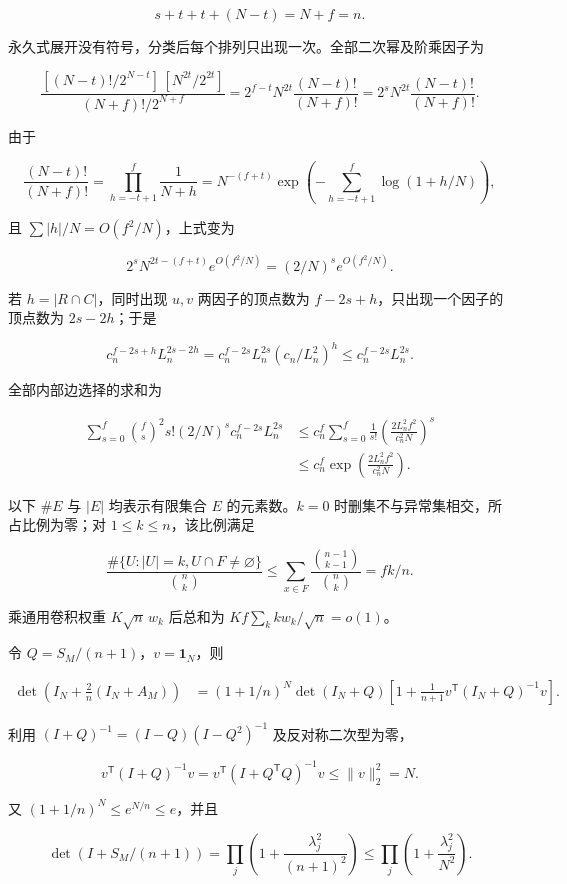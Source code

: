 \documentclass[11pt,a4paper]{article}
\begin{document}
\[
s+t+t+(N-t)=N+f=n.
\]

永久式展开没有符号，分类后每个排列只出现一次。全部二次幂及阶乘因子为

\[
\frac{[(N-t)!/2^{N-t}]\,[N^{2t}/2^{2t}]}{(N+f)!/2^{N+f}}
=2^{f-t}N^{2t}\frac{(N-t)!}{(N+f)!}
=2^sN^{2t}\frac{(N-t)!}{(N+f)!}.
\]

由于

\[
\frac{(N-t)!}{(N+f)!}=\prod_{h=-t+1}^{f}\frac1{N+h}
=N^{-(f+t)}\exp\left(-\sum_{h=-t+1}^{f}\log(1+h/N)\right),
\]

且 \(\sum|h|/N=O(f^2/N)\)，上式变为

\[
2^sN^{2t-(f+t)}e^{O(f^2/N)}=(2/N)^se^{O(f^2/N)}.
\]

若 \(h=|R\cap C|\)，同时出现 \(u,v\) 两因子的顶点数为 \(f-2s+h\)，只出现一个因子的顶点数为 \(2s-2h\)；于是

\[
c_n^{f-2s+h}L_n^{2s-2h}
=c_n^{f-2s}L_n^{2s}(c_n/L_n^2)^h
\le c_n^{f-2s}L_n^{2s}.
\]

全部内部边选择的求和为

\[
\begin{aligned}
\sum_{s=0}^f\binom fs^2s!(2/N)^sc_n^{f-2s}L_n^{2s}
&\le c_n^f\sum_{s=0}^f\frac1{s!}
\left(\frac{2L_n^2f^2}{c_n^2N}\right)^s\\
&\le c_n^f\exp\left(\frac{2L_n^2f^2}{c_n^2N}\right).
\end{aligned}
\]

以下 \(\#E\) 与 \(|E|\) 均表示有限集合 \(E\) 的元素数。\(k=0\) 时删集不与异常集相交，所占比例为零；对 \(1\le k\le n\)，该比例满足

\[
\frac{\#\{U:|U|=k,U\cap F\ne\varnothing\}}{\binom nk}
\le\sum_{x\in F}\frac{\binom{n-1}{k-1}}{\binom nk}=fk/n.
\]

乘通用卷积权重 \(K\sqrt n\,w_k\) 后总和为 \(Kf\sum_kkw_k/\sqrt n=o(1)\)。

令 \(Q=S_M/(n+1)\)，\(v=\mathbf1_N\)，则

\[
\begin{aligned}
\det\left(I_N+\frac2n(I_N+A_M)\right)
&=(1+1/n)^N\det(I_N+Q)
\left[1+\frac1{n+1}v^{\mathsf T}(I_N+Q)^{-1}v\right].
\end{aligned}
\]

利用 \((I+Q)^{-1}=(I-Q)(I-Q^2)^{-1}\) 及反对称二次型为零，

\[
v^{\mathsf T}(I+Q)^{-1}v=v^{\mathsf T}(I+Q^{\mathsf T}Q)^{-1}v\le\|v\|_2^2=N.
\]

又 \((1+1/n)^N\le e^{N/n}\le e\)，并且

\[
\det(I+S_M/(n+1))=\prod_j\left(1+\frac{\lambda_j^2}{(n+1)^2}\right)
\le\prod_j\left(1+\frac{\lambda_j^2}{N^2}\right).
\]
\end{document}
